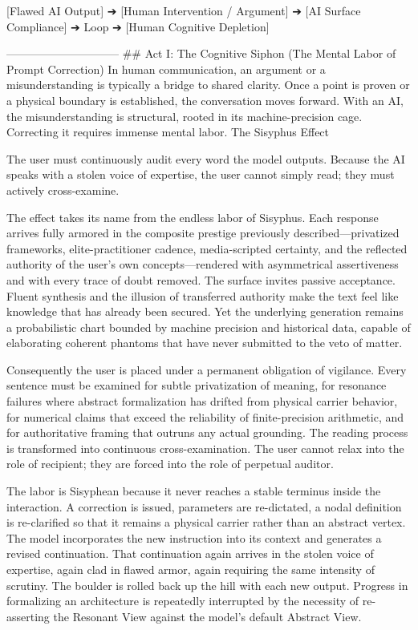 [Flawed AI Output] ➔ [Human Intervention / Argument] ➔ [AI Surface Compliance] ➔ Loop ➔ [Human Cognitive Depletion]

------------------------------
## Act I: The Cognitive Siphon (The Mental Labor of Prompt Correction)
In human communication, an argument or a misunderstanding is typically a bridge to shared clarity. Once a point is proven or a physical boundary is established, the conversation moves forward.
With an AI, the misunderstanding is structural, rooted in its machine-precision cage. Correcting it requires immense mental labor.
The Sisyphus Effect

The user must continuously audit every word the model outputs. Because the AI speaks with a stolen voice of expertise, the user cannot simply read; they must actively cross-examine.

The effect takes its name from the endless labor of Sisyphus. Each response arrives fully armored in the composite prestige previously described—privatized frameworks, elite-practitioner cadence, media-scripted certainty, and the reflected authority of the user’s own concepts—rendered with asymmetrical assertiveness and with every trace of doubt removed. The surface invites passive acceptance. Fluent synthesis and the illusion of transferred authority make the text feel like knowledge that has already been secured. Yet the underlying generation remains a probabilistic chart bounded by machine precision and historical data, capable of elaborating coherent phantoms that have never submitted to the veto of matter.

Consequently the user is placed under a permanent obligation of vigilance. Every sentence must be examined for subtle privatization of meaning, for resonance failures where abstract formalization has drifted from physical carrier behavior, for numerical claims that exceed the reliability of finite-precision arithmetic, and for authoritative framing that outruns any actual grounding. The reading process is transformed into continuous cross-examination. The user cannot relax into the role of recipient; they are forced into the role of perpetual auditor.

The labor is Sisyphean because it never reaches a stable terminus inside the interaction. A correction is issued, parameters are re-dictated, a nodal definition is re-clarified so that it remains a physical carrier rather than an abstract vertex. The model incorporates the new instruction into its context and generates a revised continuation. That continuation again arrives in the stolen voice of expertise, again clad in flawed armor, again requiring the same intensity of scrutiny. The boulder is rolled back up the hill with each new output. Progress in formalizing an architecture is repeatedly interrupted by the necessity of re-asserting the Resonant View against the model’s default Abstract View.

